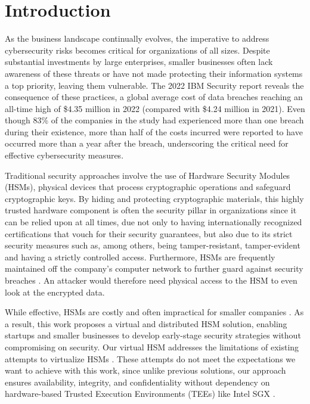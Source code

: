 \documentclass[runningheads]{llncs}
\begin{document}
\section{Introduction} \label{sec:introduction}

As the business landscape continually evolves, the imperative to address cybersecurity risks becomes critical for organizations of all sizes. Despite substantial investments by large enterprises, smaller businesses often lack awareness of these threats or have not made protecting their information systems a top priority, leaving them vulnerable. The 2022 IBM Security report \cite{ibmsec2022} reveals the consequence of these practices, a global average cost of data breaches reaching an all-time high of \$4.35 million in 2022 (compared with \$4.24 million in 2021). Even though 83\% of the companies in the study had experienced more than one breach during their existence, more than half of the costs incurred were reported to have occurred more than a year after the breach, underscoring the critical need for effective cybersecurity measures.

Traditional security approaches involve the use of Hardware Security Modules (HSMs), physical devices that process cryptographic operations and safeguard cryptographic keys. By hiding and protecting cryptographic materials, this highly trusted hardware component is often the security pillar in organizations since it can be relied upon at all times, due not only to having internationally recognized certifications that vouch for their security guarantees, but also due to its strict security measures such as, among others, being tamper-resistant, tamper-evident and having a strictly controlled access. Furthermore, HSMs are frequently maintained off the company's computer network to further guard against security breaches \cite{hsmdefinition}. An attacker would therefore need physical access to the HSM to even look at the encrypted data. 

While effective, HSMs are costly and often impractical for smaller companies \cite{hsmeconomics}. As a result, this work proposes a virtual and distributed HSM solution, enabling startups and smaller businesses to develop early-stage security strategies without compromising on security.
Our virtual HSM addresses the limitations of existing attempts to virtualize HSMs \cite{softhsm,pmhsm,rosahsmthesis}. These attempts do not meet the expectations we want to achieve with this work, since unlike previous solutions, our approach ensures availability, integrity, and confidentiality without dependency on hardware-based Trusted Execution Environments (TEEs) like Intel SGX \cite{intelsgx}. 
\end{document}
